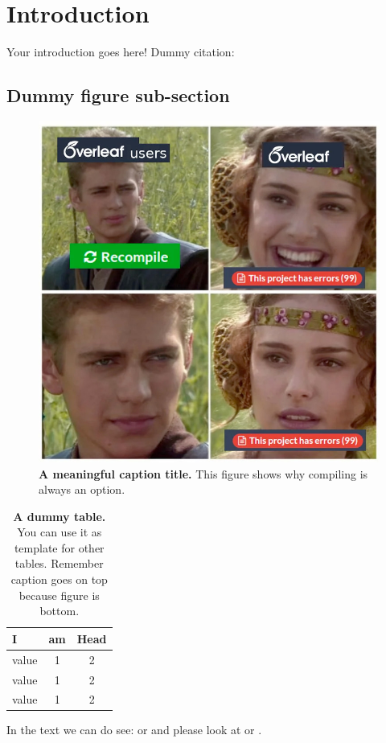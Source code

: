 \section{Introduction}\label{sec:introduction}
Your introduction goes here! Dummy citation: \cite{Alberts.2015}

\subsection{Dummy figure sub-section}\label{ssec:Dummyfiguresub-section}

\begin{figure}[h]%
    \centering
    \includegraphics[width=.5\textwidth]{fig/overleaf.jpg}
    \caption{\textbf{A meaningful caption title.} This figure shows why compiling is always an option.}
    \label{fig:Ameaningfullcaption}
\end{figure}

\begin{table}[h]%
    \centering
    \caption{\textbf{A dummy table.} You can use it as template for other tables. Remember caption goes on top because figure is bottom.}
    \label{tab:Thisisadummytable}
        \begin{tabular}{lcc} %
            \toprule
            \textbf{I}       &   \textbf{am}   &   \textbf{Head}    \\
            \midrule
            value   &   1    &   2       \\
            value   &   1    &   2       \\
            value   &   1    &   2       \\
            \bottomrule
        \end{tabular}
\end{table}


In the text we can do see:  or  and please look at  or .
